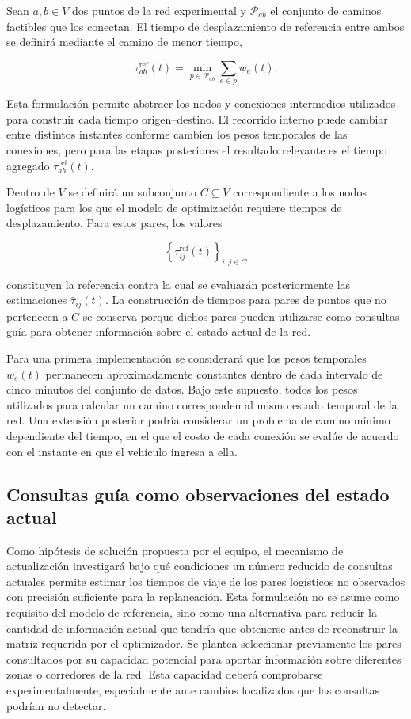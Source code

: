 \documentclass[11pt]{article}
\begin{document}
Sean \(a,b\in V\) dos puntos de la red experimental y
\(\mathcal{P}_{ab}\) el conjunto de caminos factibles que los conectan. El
tiempo de desplazamiento de referencia entre ambos se definirá mediante el
camino de menor tiempo,

\[
\tau_{ab}^{\mathrm{ref}}(t)
=
\min_{p\in\mathcal{P}_{ab}}
\sum_{e\in p} w_e(t).
\]

Esta formulación permite abstraer los nodos y conexiones intermedios utilizados
para construir cada tiempo origen--destino. El recorrido interno puede cambiar
entre distintos instantes conforme cambien los pesos temporales de las
conexiones, pero para las etapas posteriores el resultado relevante es el
tiempo agregado \(\tau_{ab}^{\mathrm{ref}}(t)\).

Dentro de \(V\) se definirá un subconjunto \(C\subseteq V\) correspondiente a
los nodos logísticos para los que el modelo de optimización requiere tiempos
de desplazamiento. Para estos pares, los valores

\[
\left\{
\tau_{ij}^{\mathrm{ref}}(t)
\right\}_{i,j\in C}
\]

constituyen la referencia contra la cual se evaluarán posteriormente las
estimaciones \(\widehat{\tau}_{ij}(t)\). La construcción de tiempos para pares
de puntos que no pertenecen a \(C\) se conserva porque dichos pares pueden
utilizarse como consultas guía para obtener información sobre el estado actual
de la red.

Para una primera implementación se considerará que los pesos temporales
\(w_e(t)\) permanecen aproximadamente constantes dentro de cada intervalo de
cinco minutos del conjunto de datos. Bajo este supuesto, todos los pesos
utilizados para calcular un camino corresponden al mismo estado temporal de
la red. Una extensión posterior podría considerar un problema de camino
mínimo dependiente del tiempo, en el que el costo de cada conexión se evalúe
de acuerdo con el instante en que el vehículo ingresa a ella.

\subsection{Consultas guía como observaciones del estado actual}

Como hipótesis de solución propuesta por el equipo, el mecanismo de
actualización investigará bajo qué condiciones un número reducido de consultas
actuales permite estimar los tiempos de viaje de los pares logísticos no
observados con precisión suficiente para la replaneación. Esta formulación no
se asume como requisito del modelo de referencia, sino como una alternativa
para reducir la cantidad de información actual que tendría que obtenerse antes
de reconstruir la matriz requerida por el optimizador. Se plantea seleccionar
previamente los pares consultados por su capacidad potencial para aportar
información sobre diferentes zonas o corredores de la red. Esta capacidad
deberá comprobarse experimentalmente, especialmente ante cambios localizados
que las consultas podrían no detectar.
\end{document}
